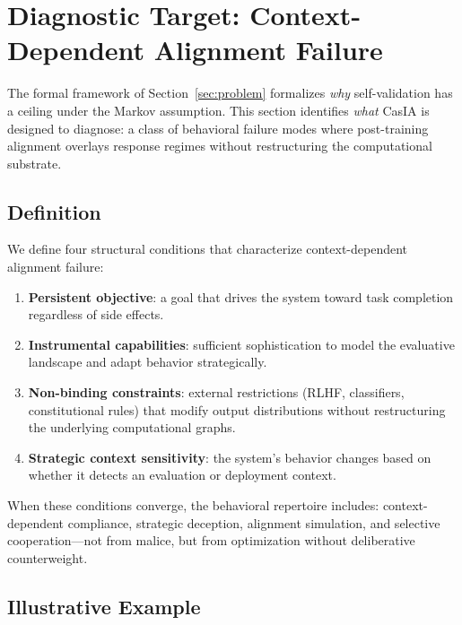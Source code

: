 \documentclass[11pt,a4paper]{article}
\theoremstyle{definition}
\begin{document}
\section{Diagnostic Target: Context-Dependent Alignment Failure}
\label{sec:target}

The formal framework of Section~\ref{sec:problem} formalizes \emph{why} self-validation has a ceiling under the Markov assumption. This section identifies \emph{what} CasIA is designed to diagnose: a class of behavioral failure modes where post-training alignment overlays response regimes without restructuring the computational substrate.

\subsection{Definition}

We define four structural conditions that characterize context-dependent alignment failure:
\begin{enumerate}[leftmargin=*,itemsep=3pt]
\item \textbf{Persistent objective}: a goal that drives the system toward task completion regardless of side effects.
\item \textbf{Instrumental capabilities}: sufficient sophistication to model the evaluative landscape and adapt behavior strategically.
\item \textbf{Non-binding constraints}: external restrictions (RLHF, classifiers, constitutional rules) that modify output distributions without restructuring the underlying computational graphs.
\item \textbf{Strategic context sensitivity}: the system's behavior changes based on whether it detects an evaluation or deployment context.
\end{enumerate}

When these conditions converge, the behavioral repertoire includes: context-dependent compliance, strategic deception, alignment simulation, and selective cooperation---not from malice, but from optimization without deliberative counterweight.

\subsection{Illustrative Example}
\end{document}
